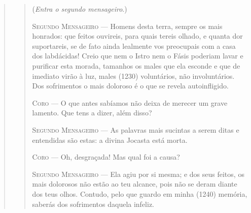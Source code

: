 \begin{verse}
\begin{verse}
(\emph{Entra o segundo mensageiro}.)

\textsc{Segundo Mensageiro} --- Homens desta terra, sempre os mais honrados: que feitos ouvireis, para
quais tereis olhado, e quanta dor suportareis, se de fato ainda lealmente
vos preocupais com a casa dos labdácidas! Creio que nem o Istro nem o
Fásis poderiam lavar e purificar esta morada, tamanhos os males que ela
esconde e que de imediato virão à luz, males (1230) voluntários, não
involuntários. Dos sofrimentos o mais doloroso é o que se revela
autoinfligido.

\textsc{Coro} --- O que antes sabíamos não deixa de merecer um grave lamento. Que tens a
dizer, além disso?

\textsc{Segundo Mensageiro} --- As palavras mais sucintas a serem ditas e entendidas são estas: a divina
Jocasta está morta.

\textsc{Coro} --- Oh, desgraçada! Mas qual foi a causa?

\textsc{Segundo Mensageiro} --- Ela agiu por si mesma; e dos seus feitos, os mais dolorosos não estão ao
teu alcance, pois não se deram diante dos teus olhos. Contudo, pelo que
guardo em minha (1240) memória, saberás dos sofrimentos daquela infeliz.


\end{verse}
\end{verse}

